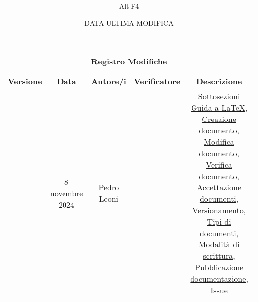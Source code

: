\documentclass[a4paper, 12pt]{article}
\title{\Huge \textbf{\titolo}}
\author{\Large{Alt} \raisebox{0.3ex}{\normalsize  +} \Large{F4}}
\date{ DATA ULTIMA MODIFICA}
\def\logo{../Immagini/logo.jpeg}
\begin{document}
\begin{titlepage}      
    \maketitle
    \thispagestyle{empty}  

\end{titlepage}

\thispagestyle{plain}
\begin{table}[!h]
    \centering
    \caption*{\textbf{\Large Registro Modifiche}}
    {\renewcommand{\arraystretch}{2}
    \begin{tabularx}{\textwidth}{| c | c | C | C | C |}
        \hline
            \textbf{\normalsize Versione} & 
            \textbf{\normalsize Data} & 
            \textbf{\normalsize Autore/i} & 
            \textbf{\normalsize Verificatore} &
            \textbf{\normalsize Descrizione} \\ 
        \hline \hline
         & 
        8 novembre 2024  & 
        Pedro Leoni &
        & 
        Sottosezioni \hyperref[subsec:cre]{Guida a \LaTeX}, 
        \hyperref[subsec:cre]{Creazione documento}, \hyperref[subsec:cre]{Modifica documento}, \hyperref[subsec:ver]{Verifica documento}, \hyperref[subsec:acc]{Accettazione documenti}, \hyperref[subsec:vers]{Versionamento}, \hyperref[subsec:docs]{Tipi di documenti}, \hyperref[subsec:mod]{Modalità di scrittura}, \hyperref[subsec:pub]{Pubblicazione documentazione}, \hyperref[subsec:issue]{Issue}\\
        \hline 
    \end{tabularx}}
\end{table}
\restoregeometry
\end{document}
